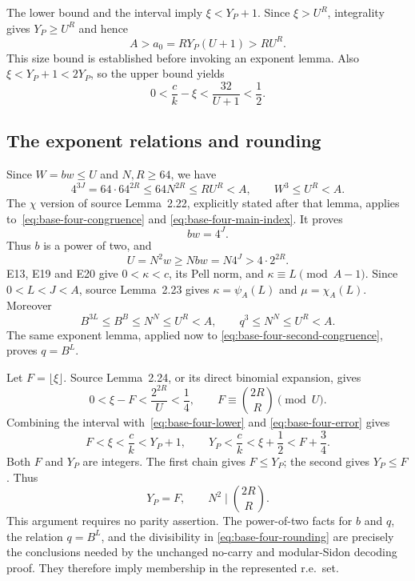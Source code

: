 The lower bound and the interval imply $\xi<Y_P+1$.
Since $\xi>U^R$, integrality gives $Y_P\ge U^R$ and hence
\begin{equation}\label{eq:base-four-size}
 A>a_0=RY_P(U+1)>RU^R.
\end{equation}
This size bound is established before invoking an exponent lemma.
Also $\xi<Y_P+1<2Y_P$, so the upper bound yields
\begin{equation}\label{eq:base-four-error}
 0<\frac ck-\xi<\frac{32}{U+1}<\frac12.
\end{equation}

\subsection{The exponent relations and rounding}

Since $W=bw\le U$ and $N,R\ge64$, we have
\[
 4^{3J}=64\cdot64^{2R}
       \le64N^{2R}\le RU^R<A,
 \qquad W^3\le U^R<A.
\]
The $\chi$ version of source Lemma~2.22, explicitly stated after
that lemma, applies to~\eqref{eq:base-four-congruence} and
\eqref{eq:base-four-main-index}. It proves
\begin{equation}\label{eq:base-four-power}
 bw=4^J.
\end{equation}
Thus $b$ is a power of two, and
\[
 U=N^2w\ge Nbw=N4^J>4\cdot2^{2R}.
\]
E13, E19 and E20 give $0<\kappa<c$, its Pell norm, and
$\kappa\equiv L\pmod{A-1}$. Since $0<L<J<A$, source
Lemma~2.23 gives $\kappa=\psi_A(L)$ and $\mu=\chi_A(L)$.
Moreover
\[
 B^{3L}\le B^B\le N^N\le U^R<A,
 \qquad q^3\le N^N\le U^R<A.
\]
The same exponent lemma, applied now to
\eqref{eq:base-four-second-congruence}, proves $q=B^L$.

Let $F=\lfloor\xi\rfloor$. Source Lemma~2.24, or its direct
binomial expansion, gives
\begin{equation}\label{eq:base-four-fraction}
 0<\xi-F<\frac{2^{2R}}U<\frac14,
 \qquad F\equiv\binom{2R}{R}\pmod U.
\end{equation}
Combining the interval with~\eqref{eq:base-four-lower} and
\eqref{eq:base-four-error} gives
\[
 F<\xi<\frac ck<Y_P+1,
 \qquad Y_P<\frac ck<\xi+\frac12<F+\frac34.
\]
Both $F$ and $Y_P$ are integers. The first chain gives $F\le Y_P$;
the second gives $Y_P\le F$. Thus
\begin{equation}\label{eq:base-four-rounding}
 Y_P=F,\qquad N^2\mid\binom{2R}{R}.
\end{equation}
This argument requires no parity assertion. The power-of-two facts
for $b$ and $q$, the relation $q=B^L$, and the divisibility in
\eqref{eq:base-four-rounding} are precisely the conclusions needed
by the unchanged no-carry and modular-Sidon decoding proof.
They therefore imply membership in the represented r.e.\ set.

